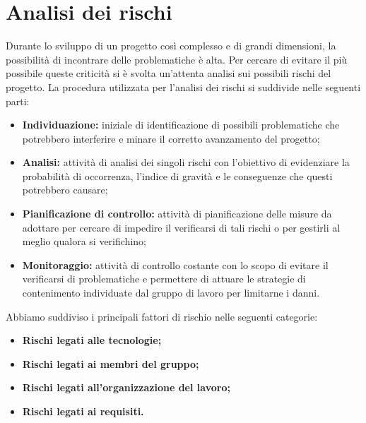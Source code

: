 \section{Analisi dei rischi}
\label{analisi_dei_rischi}
Durante lo sviluppo di un progetto così complesso e di grandi dimensioni, la possibilità di incontrare delle problematiche è alta. Per cercare di evitare il più possibile queste criticità si è svolta un'attenta analisi sui possibili rischi del progetto. La procedura utilizzata per l'analisi dei rischi si suddivide nelle seguenti parti:
\begin{itemize}
    \item \textbf{Individuazione:}  iniziale di identificazione di possibili problematiche che potrebbero interferire e minare il corretto avanzamento del progetto;
    \item \textbf{Analisi:} attività di analisi dei singoli rischi con l'obiettivo di evidenziare la probabilità di occorrenza, l'indice di gravità e le conseguenze che questi potrebbero causare;
    \item \textbf{Pianificazione di controllo:} attività di pianificazione delle misure da adottare per cercare di impedire il verificarsi di tali rischi o per gestirli al meglio qualora si verifichino;
    \item \textbf{Monitoraggio:} attività di controllo costante con lo scopo di evitare il verificarsi di problematiche e permettere di attuare le strategie di contenimento individuate dal gruppo di lavoro per limitarne i danni.
\end{itemize}
Abbiamo suddiviso i principali fattori di rischio nelle seguenti categorie:
\begin{itemize}
    \item \textbf{Rischi legati alle tecnologie;}
    \item \textbf{Rischi legati ai membri del gruppo;}
    \item \textbf{Rischi legati all'organizzazione del lavoro;}
    \item \textbf{Rischi legati ai requisiti.}
\end{itemize}

\renewcommand{\arraystretch}{1.5}

\newpage


\newpage

%


\newpage


\newpage
